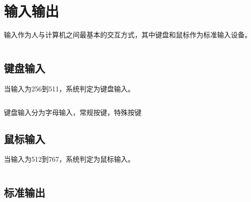 \section{输入输出}

输入作为人与计算机之间最基本的交互方式，其中键盘和鼠标作为标准输入设备。

\begin{listing}[H]
  \inputminted[tabsize=2, firstline=151, lastline=151,
  linenos=true]{c}{../ZOS/src/kernel/bootpack.c}
\end{listing}

\newpage
\subsection{键盘输入}
当输入为256到511，系统判定为键盘输入。
\begin{listing}[H]
  \inputminted[tabsize=2, firstline=161, lastline=161,
  linenos=true]{c}{../ZOS/src/kernel/bootpack.c}
\end{listing}
键盘输入分为字母输入，常规按键，特殊按键

\newpage
\subsection{鼠标输入}
当输入为512到767，系统判定为鼠标输入。
\begin{listing}[H]
  \inputminted[tabsize=2, firstline=247, lastline=247,
  linenos=true]{c}{../ZOS/src/kernel/bootpack.c}
\end{listing}

\newpage
\subsection{标准输出}
